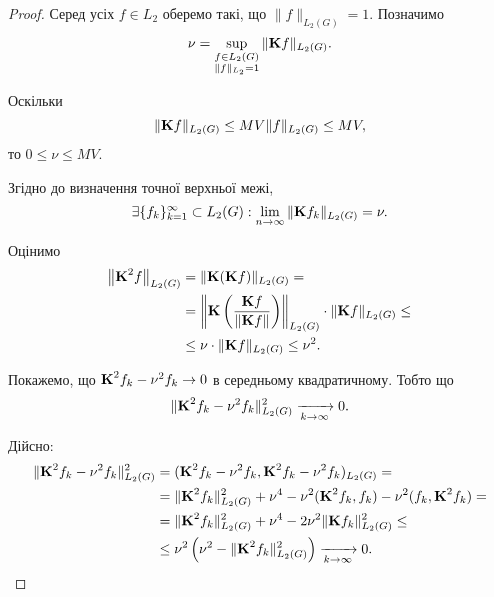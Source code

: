 \begin{proof}
	Серед усіх $f \in L_2$ оберемо такі, що $\|f\|_{L_2(G)} = 1$. Позначимо 
	\begin{equation}
		\nu = \Sup_{\substack{f \in L_2(G) \\ \|f\|_{L_2} = 1}} \|\bf{K} f\|_{L_2(G)}.
	\end{equation}
	
	Оскільки
	\begin{equation}
		\|\bf{K} f\|_{L_2(G)} \le MV \|f\|_{L_2(G)} \le MV,
	\end{equation}
    то $0 \le \nu \le MV$. \medskip

	Згідно до визначення точної верхньої межі,
	\begin{equation}
		\exists \{ f_k \}_{k = 1}^\infty \subset L_2(G):\lim_{n \to \infty} \|\bf{K} f_k\|_{L_2(G)} = \nu.
	\end{equation}

	Оцінимо 
	\begin{equation}
		\begin{aligned} 
		\left\| \bf{K}^2 f\right\|_{L_2(G)} &= \| \bf{K} (\bf{K} f)\|_{L_2(G)} = \\
		&=  \left\| \bf{K}\left( \dfrac{\bf{K}f}{\|\bf{K}f\|}\right) \right\|_{L_2(G)} \cdot \|\bf{K} f\|_{L_2(G)} \le \\
		&\le  \nu \cdot \|\bf{K} f\|_{L_2(G)} \le \nu^2.
		\end{aligned}
	\end{equation}
	
	Покажемо, що $\bf{K}^2 f_k - \nu^2 f_k \to 0$ в середньому квадратичному. Тобто що
	\begin{equation}
		\| \bf{K}^2 f_k - \nu^2 f_k \|_{L_2(G)}^2 \xrightarrow[k \to \infty]{} 0.
	\end{equation}

	Дійсно:
	\begin{equation}
		\begin{aligned}
			\| \bf{K}^2 f_k - \nu^2 f_k \|_{L_2(G)}^2 &= (\bf{K}^2 f_k - \nu^2 f_k, \bf{K}^2 f_k - \nu^2 f_k)_{L_2(G)} = \\
			&= \|\bf{K}^2 f_k\|_{L_2(G)}^2 + \nu^4 - \nu^2 (\bf{K}^2 f_k, f_k) - \nu^2 (f_k, \bf{K}^2 f_k) = \\
			&= \|\bf{K}^2 f_k\|_{L_2(G)}^2 + \nu^4 - 2 \nu^2 \|\bf{K} f_k\|_{L_2(G)}^2 \le \\
			&\le \nu^2 \left(\nu^2 - \|\bf{K}^2 f_k\|_{L_2(G)}^2\right) \xrightarrow[k\to\infty]{} 0.
		\end{aligned}
	\end{equation}


\end{proof}
